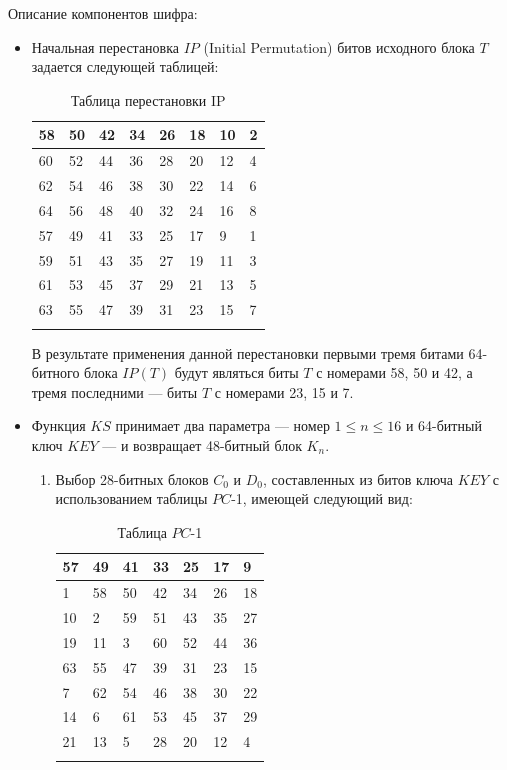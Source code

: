 \documentclass{./civarticle}
\begin{document}
Описание компонентов шифра:
\begin{itemize}
    \item Начальная перестановка $IP$ (Initial Permutation) битов исходного блока $T$ задается следующей таблицей:

\begin{longtable}{|p{0.5cm}|p{0.5cm}|p{0.5cm}|p{0.5cm}|p{0.5cm}|p{0.5cm}|p{0.5cm}|p{0.5cm}|}
\hline
58 & 50 & 42 & 34 & 26 & 18 & 10 & 2 \\
\hline
60 & 52 & 44 & 36 & 28 & 20 & 12 & 4 \\
\hline
62 & 54 & 46 & 38 & 30 & 22 & 14 & 6 \\
\hline
64 & 56 & 48 & 40 & 32 & 24 & 16 & 8 \\
\hline
57 & 49 & 41 & 33 & 25 & 17 & 9 & 1 \\
\hline
59 & 51 & 43 & 35 & 27 & 19 & 11 & 3 \\
\hline
61 & 53 & 45 & 37 & 29 & 21 & 13 & 5 \\
\hline
63 & 55 & 47 & 39 & 31 & 23 & 15 & 7 \\
\hline
\caption{Таблица перестановки IP}
\end{longtable}

В результате применения данной перестановки первыми тремя битами 64-битного блока $IP(T)$ будут являться биты $T$ с номерами 58, 50 и 42, а тремя последними --- биты $T$ с номерами 23, 15 и 7.

\item Функция $KS$ принимает два параметра --- номер $1 \leq n \leq 16$ и 64-битный ключ $KEY$ --- и возвращает 48-битный блок $K_n$.

\begin{enumerate}
    \item Выбор 28-битных блоков $C_0$ и $D_0$, составленных из битов ключа $KEY$ с использованием таблицы $PC$-1, имеющей следующий вид:

    \begin{longtable}{|p{0.5cm}|p{0.5cm}|p{0.5cm}|p{0.5cm}|p{0.5cm}|p{0.5cm}|p{0.5cm}|}
\hline
57 & 49 & 41 & 33 & 25 & 17 & 9 \\
\hline
1 & 58 & 50 & 42 & 34 & 26 & 18 \\
\hline
10 & 2 & 59 & 51 & 43 & 35 & 27 \\
\hline
19 & 11 & 3 & 60 & 52 & 44 & 36 \\
\hline
63 & 55 & 47 & 39 & 31 & 23 & 15 \\
\hline
7 & 62 & 54 & 46 & 38 & 30 & 22 \\
\hline
14 & 6 & 61 & 53 & 45 & 37 & 29 \\
\hline
21 & 13 & 5 & 28 & 20 & 12 & 4 \\
\hline
\caption{Таблица $PC$-1}
\end{longtable}


\end{enumerate}
\end{itemize}
\end{document}
